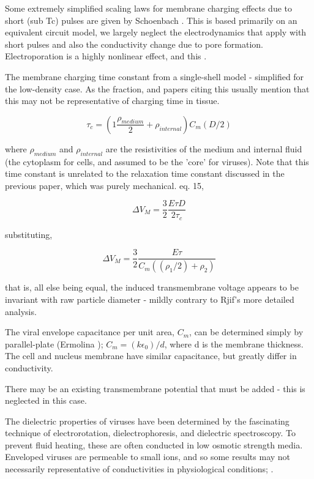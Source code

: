 \documentclass[fleqn,10pt]{paper}
\begin{document}
Some extremely simplified scaling laws for membrane charging effects due to short (sub Tc) pulses are given by Schoenbach \cite{Bioelectric2007}. This is based primarily on an equivalent circuit model, we largely neglect the electrodynamics that apply with short pulses and also the conductivity change due to pore formation. Electroporation is a highly nonlinear effect\cite{Letter1974}, and this .

The membrane charging time constant from a single-shell model \cite{Ultrashort2004} - simplified for the low-density case. As the fraction, and papers citing this usually mention that this may not be representative of charging time in tissue.

$$\tau_c = \left(1 \frac{\rho_{medium}}{2} + \rho_{internal}\right) C_m (D/2)$$

where $\rho_{medium}$ and $\rho_{internal}$ are the resistivities of the medium and internal fluid (the cytoplasm for cells, and assumed to be the 'core' for viruses). Note that this time constant is unrelated to the relaxation time constant discussed in the previous paper, which was purely mechanical. \cite{Bioelectric2007} eq. 15, 

$$\Delta V_M = \frac{3}{2}\frac{E\tau D}{2 \tau_c }$$

substituting,

$$\Delta V_M = \frac{3}{2}\frac{E \tau}{C_m ((\rho_1/2) + \rho_2)}$$

that is, all else being equal, the induced transmembrane voltage appears to be invariant with raw particle diameter - mildly contrary to Rjif's more detailed analysis.

The viral envelope capacitance per unit area, $C_m$, can be determined simply by parallel-plate (Ermolina \cite{Study2001}); $C_m = (k\epsilon_0) / d$, where d is the membrane thickness. The cell and nucleus membrane have similar capacitance, but greatly differ in conductivity. 

There may be an existing transmembrane potential that must be added - this is neglected in this case.

The dielectric properties of viruses have been determined by the fascinating technique of electrorotation, dielectrophoresis, and dielectric spectroscopy. To prevent fluid heating, these are often conducted in low osmotic strength media. Enveloped viruses are permeable to small ions, and so some results may not necessarily representative of conductivities in physiological conditions; \cite{Assessment}.
\end{document}
